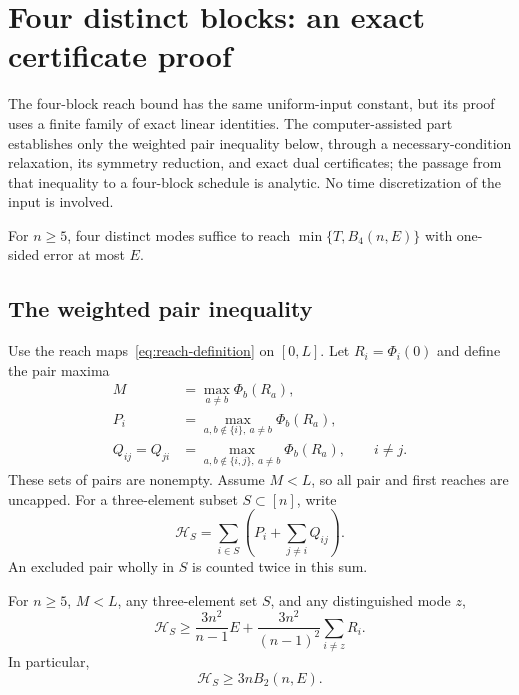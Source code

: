 \section{Four distinct blocks: an exact certificate proof}\label{sec:reach-four}

The four-block reach bound has the same uniform-input constant, but its
proof uses a finite family of exact linear identities. The computer-assisted
part establishes only the weighted pair inequality below, through a
necessary-condition relaxation, its symmetry reduction, and exact dual
certificates; the passage from that inequality to a four-block schedule is
analytic. No time discretization of the input is involved.

\begin{theorem}\label{thm:reach-four}
For $n\ge5$, four distinct modes suffice to reach $\min\{T,B_4(n,E)\}$
with one-sided error at most $E$.
\end{theorem}

\subsection{The weighted pair inequality}

Use the reach maps~\eqref{eq:reach-definition} on $[0,L]$. Let
$R_i=\Phi_i(0)$ and define the pair maxima
\begin{equation}\label{eq:pair-exclusions-four}
 \begin{split}
 M&=\max_{a\ne b}\Phi_b(R_a),\\
 P_i&=\max_{a,b\notin\{i\},\ a\ne b}\Phi_b(R_a),\\
 Q_{ij}=Q_{ji}&=
 \max_{a,b\notin\{i,j\},\ a\ne b}\Phi_b(R_a),\qquad i\ne j.
 \end{split}
\end{equation}
These sets of pairs are nonempty. Assume $M<L$, so all pair and first
reaches are uncapped. For a three-element subset $S\subset[n]$, write
\begin{equation}\label{eq:H-S}
 \mathcal H_S=\sum_{i\in S}\left(P_i+\sum_{j\ne i}Q_{ij}\right).
\end{equation}
An excluded pair wholly in $S$ is counted twice in this sum.

\begin{lemma}\label{lem:weighted-pair}
For $n\ge5$, $M<L$, any three-element set $S$, and any distinguished
mode $z$,
\begin{equation}\label{eq:weighted-pair-strong}
 \mathcal H_S\ge \frac{3n^2}{n-1}E
       +\frac{3n^2}{(n-1)^2}\sum_{i\ne z}R_i.
\end{equation}
In particular,
\begin{equation}\label{eq:weighted-pair}
 \mathcal H_S\ge3nB_2(n,E).
\end{equation}
\end{lemma}

